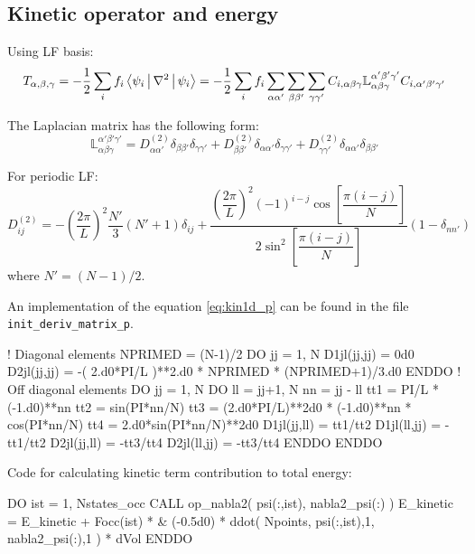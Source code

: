 \subsection{Kinetic operator and energy}

Using LF basis:
\begin{equation}
T_{\alpha,\beta,\gamma} = -\frac{1}{2} \sum_{i} f_{i}
\Braket{ \psi_{i} | \nabla^2 | \psi_{i} } =
-\frac{1}{2}
\sum_{i} f_{i} \sum_{\alpha\alpha'} \sum_{\beta\beta'} \sum_{\gamma\gamma'}
C_{i,\alpha\beta\gamma} \mathbb{L}_{\alpha\beta\gamma}^{\alpha'\beta'\gamma'}
C_{i,\alpha'\beta'\gamma'}
\end{equation}

The Laplacian matrix has the following form:
\begin{equation}
\mathbb{L}_{\alpha\beta\gamma}^{\alpha'\beta'\gamma'} =
D^{(2)}_{\alpha\alpha'}\delta_{\beta\beta'}\delta_{\gamma\gamma'} +
D^{(2)}_{\beta\beta'}\delta_{\alpha\alpha'}\delta_{\gamma\gamma'} +
D^{(2)}_{\gamma\gamma'}\delta_{\alpha\alpha'}\delta_{\beta\beta'}
\end{equation}

For periodic LF:
\begin{equation}
D^{(2)}_{ij} = -\left( \frac{2\pi}{L} \right)^2 \frac{N'}{3} \left( N' + 1 \right) \delta_{ij} +
\dfrac{ \left(\dfrac{2\pi}{L}\right)^2 (-1)^{i-j}\cos\left[\dfrac{\pi(i-j)}{N}\right]}
{2\sin^2\left[\dfrac{\pi(i-j)}{N}\right]}
(1-\delta_{nn'})
\label{eq:kin1d_p}
\end{equation}
where $N' = (N-1)/2$.

An implementation of the equation \eqref{eq:kin1d_p} can be found in the file
{\tt init\_deriv\_matrix\_p}.
\begin{fortrancode}
! Diagonal elements
NPRIMED = (N-1)/2
DO jj = 1, N
  D1jl(jj,jj) = 0d0
  D2jl(jj,jj) = -( 2.d0*PI/L )**2.d0 * NPRIMED * (NPRIMED+1)/3.d0
ENDDO
! Off diagonal elements
DO jj = 1, N
  DO ll = jj+1, N
    nn = jj - ll
    tt1 = PI/L * (-1.d0)**nn
    tt2 = sin(PI*nn/N)
    tt3 = (2.d0*PI/L)**2d0 * (-1.d0)**nn * cos(PI*nn/N)
    tt4 = 2.d0*sin(PI*nn/N)**2d0
    D1jl(jj,ll) =  tt1/tt2
    D1jl(ll,jj) = -tt1/tt2
    D2jl(jj,ll) = -tt3/tt4
    D2jl(ll,jj) = -tt3/tt4
  ENDDO
ENDDO
\end{fortrancode}

Code for calculating kinetic term contribution to total energy:
\begin{fortrancode}
DO ist = 1, Nstates_occ
  CALL op_nabla2( psi(:,ist), nabla2_psi(:) )
  E_kinetic = E_kinetic + Focc(ist) * &
              (-0.5d0) * ddot( Npoints, psi(:,ist),1, nabla2_psi(:),1 ) * dVol
ENDDO
\end{fortrancode}

